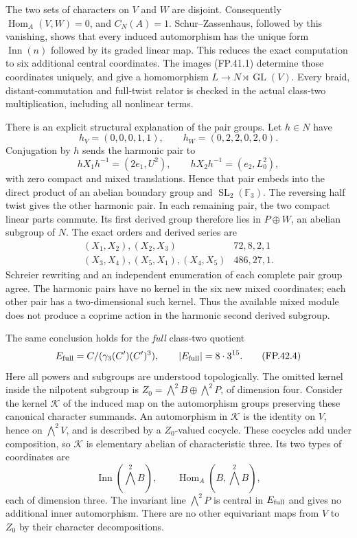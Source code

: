 The two sets of characters on $V$ and $W$ are disjoint.
Consequently $\operatorname{Hom}_A(V,W)=0$, and
$C_N(A)=1$. Schur--Zassenhaus, followed by this vanishing,
shows that every induced automorphism has the unique form
$\operatorname{Inn}(n)$ followed by its graded linear map.
This reduces the exact computation to six additional central
coordinates. The images (FP.41.1) determine those coordinates
uniquely, and give a homomorphism
$L\to N\rtimes\operatorname{GL}(V)$. Every braid,
distant-commutation and full-twist relator is checked in the
actual class-two multiplication, including all nonlinear terms.

There is an explicit structural explanation of the pair groups.
Let $h\in N$ have
\[
 h_V=(0,0,0,1,1),\qquad
 h_W=(0,2,2,0,2,0).
\]
Conjugation by $h$ sends the harmonic pair to
\[
 hX_1h^{-1}=(2e_1,U^2),\qquad
 hX_2h^{-1}=(e_2,L_0^2),
 \tag{FP.42.2}
\]
with zero compact and mixed translations. Hence that pair
embeds into the direct product of an abelian boundary group
and $\operatorname{SL}_2(\mathbb F_3)$. The reversing half
twist gives the other harmonic pair. In each remaining pair,
the two compact linear parts commute. Its first derived group
therefore lies in $P\oplus W$, an abelian subgroup of $N$.
The exact orders and derived series are
\[
\begin{array}{c|c}
 (X_1,X_2),(X_2,X_3)&72,8,2,1\\
 (X_3,X_4),(X_5,X_1),(X_4,X_5)&486,27,1.
\end{array}
 \tag{FP.42.3}
\]
Schreier rewriting and an independent enumeration of each
complete pair group agree. The harmonic pairs have no kernel
in the six new mixed coordinates; each other pair has a
two-dimensional such kernel. Thus the available mixed module
does not produce a coprime action in the harmonic second
derived subgroup.

The same conclusion holds for the \emph{full} class-two
quotient
\[
 E_{\rm full}=C/(\gamma_3(C')(C')^3),
       \qquad |E_{\rm full}|=8\cdot3^{15}.
 \tag{FP.42.4}
\]
Here all powers and subgroups are understood topologically.
The omitted kernel inside the nilpotent subgroup is
$Z_0=\bigwedge^2B\oplus\bigwedge^2P$, of dimension four.
Consider the kernel $\mathcal K$ of the induced map on the
automorphism groups preserving these canonical character
summands. An automorphism in $\mathcal K$ is the identity on
$V$, hence on $\bigwedge^2V$, and is described by a
$Z_0$-valued cocycle. These cocycles add under composition,
so $\mathcal K$ is elementary abelian of characteristic three.
Its two types of coordinates are
\[
 \operatorname{Inn}(\bigwedge^2B),\qquad
 \operatorname{Hom}_A(B,\bigwedge^2B),
 \tag{FP.42.5}
\]
each of dimension three. The invariant line
$\bigwedge^2P$ is central in $E_{\rm full}$ and gives no
additional inner automorphism. There are no other equivariant
maps from $V$ to $Z_0$ by their character decompositions.

